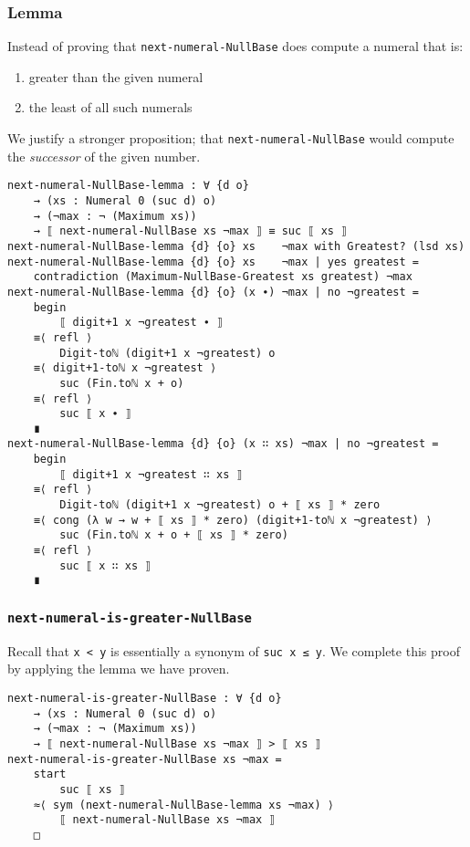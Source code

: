 \documentclass[\main/thesis.tex]{subfiles}
\begin{document}
\subsubsection{Lemma}

Instead of proving that {\lstinline|next-numeral-NullBase|} does compute a
numeral that is:
\begin{enumerate}
    \item greater than the given numeral
    \item the least of all such numerals
\end{enumerate}

We justify a stronger proposition;
that {\lstinline|next-numeral-NullBase|} would compute the \textit{successor} of
the given number.

\begin{lstlisting}[basicstyle=\ttfamily\scriptsize]
next-numeral-NullBase-lemma : ∀ {d o}
    → (xs : Numeral 0 (suc d) o)
    → (¬max : ¬ (Maximum xs))
    → ⟦ next-numeral-NullBase xs ¬max ⟧ ≡ suc ⟦ xs ⟧
next-numeral-NullBase-lemma {d} {o} xs    ¬max with Greatest? (lsd xs)
next-numeral-NullBase-lemma {d} {o} xs    ¬max | yes greatest =
    contradiction (Maximum-NullBase-Greatest xs greatest) ¬max
next-numeral-NullBase-lemma {d} {o} (x ∙) ¬max | no ¬greatest =
    begin
        ⟦ digit+1 x ¬greatest ∙ ⟧
    ≡⟨ refl ⟩
        Digit-toℕ (digit+1 x ¬greatest) o
    ≡⟨ digit+1-toℕ x ¬greatest ⟩
        suc (Fin.toℕ x + o)
    ≡⟨ refl ⟩
        suc ⟦ x ∙ ⟧
    ∎
next-numeral-NullBase-lemma {d} {o} (x ∷ xs) ¬max | no ¬greatest =
    begin
        ⟦ digit+1 x ¬greatest ∷ xs ⟧
    ≡⟨ refl ⟩
        Digit-toℕ (digit+1 x ¬greatest) o + ⟦ xs ⟧ * zero
    ≡⟨ cong (λ w → w + ⟦ xs ⟧ * zero) (digit+1-toℕ x ¬greatest) ⟩
        suc (Fin.toℕ x + o + ⟦ xs ⟧ * zero)
    ≡⟨ refl ⟩
        suc ⟦ x ∷ xs ⟧
    ∎
\end{lstlisting}

\subsubsection{{\lstinline|next-numeral-is-greater-NullBase|}}

Recall that {\lstinline|x < y|} is essentially a synonym of {\lstinline|suc x ≤ y|}.
We complete this proof by applying the lemma we have proven.

\begin{lstlisting}
next-numeral-is-greater-NullBase : ∀ {d o}
    → (xs : Numeral 0 (suc d) o)
    → (¬max : ¬ (Maximum xs))
    → ⟦ next-numeral-NullBase xs ¬max ⟧ > ⟦ xs ⟧
next-numeral-is-greater-NullBase xs ¬max =
    start
        suc ⟦ xs ⟧
    ≈⟨ sym (next-numeral-NullBase-lemma xs ¬max) ⟩
        ⟦ next-numeral-NullBase xs ¬max ⟧
    □
\end{lstlisting}
\end{document}
